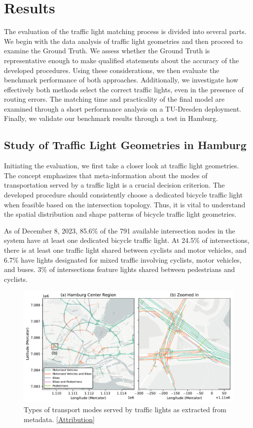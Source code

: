 \section{Results}

The evaluation of the traffic light matching process is divided into several parts. We begin with the data analysis of traffic light geometries and then proceed to examine the Ground Truth. We assess whether the Ground Truth is representative enough to make qualified statements about the accuracy of the developed procedures. Using these considerations, we then evaluate the benchmark performance of both approaches. Additionally, we investigate how effectively both methods select the correct traffic lights, even in the presence of routing errors. The matching time and practicality of the final model are examined through a short performance analysis on a TU-Dresden deployment. Finally, we validate our benchmark results through a test in Hamburg.

\subsection{Study of Traffic Light Geometries in Hamburg}

Initiating the evaluation, we first take a closer look at traffic light geometries. The concept emphasizes that meta-information about the modes of transportation served by a traffic light is a crucial decision criterion. The developed procedure should consistently choose a dedicated bicycle traffic light when feasible based on the intersection topology. Thus, it is vital to understand the spatial distribution and shape patterns of bicycle traffic light geometries.

As of December 8, 2023, 85.6\% of the 791 available intersection nodes in the system have at least one dedicated bicycle traffic light. At 24.5\% of intersections, there is at least one traffic light shared between cyclists and motor vehicles, and 6.7\% have lights designated for mixed traffic involving cyclists, motor vehicles, and buses. 3\% of intersections feature lights shared between pedestrians and cyclists.

\begin{figure}[t]
\centering
\includegraphics[width=\linewidth]{images/lanes-map.pdf}
\caption{Types of transport modes served by traffic lights as extracted from metadata. [\hyperref[attribution]{Attribution}]}
\label{fig:lanes-map}
\end{figure}

